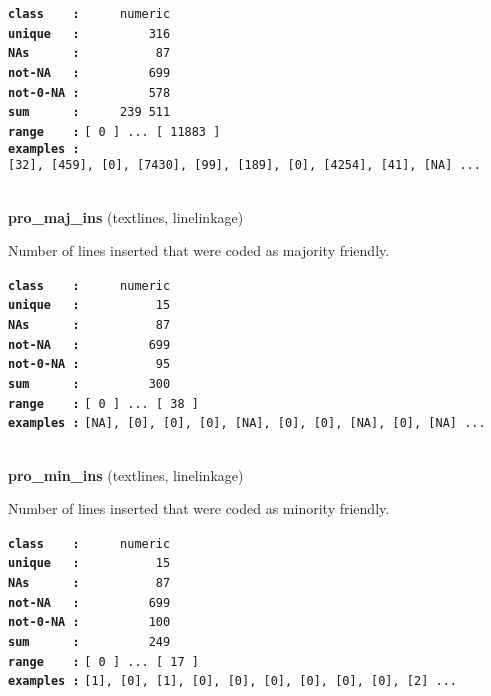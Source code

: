 \documentclass[]{article}
\begin{document}
\textbf{\texttt{class\ \ \ \ :}} \texttt{~~~~~numeric}\\
\textbf{\texttt{unique\ \ \ :}} \texttt{~~~~~~~~~316}\\
\textbf{\texttt{NAs\ \ \ \ \ \ :}} \texttt{~~~~~~~~~~87}\\
\textbf{\texttt{not-NA\ \ \ :}} \texttt{~~~~~~~~~699}\\
\textbf{\texttt{not-0-NA\ :}} \texttt{~~~~~~~~~578}\\
\textbf{\texttt{sum\ \ \ \ \ \ :}} \texttt{~~~~~239~511}\\
\textbf{\texttt{range\ \ \ \ :}}
\texttt{{[}\ 0\ {]}\ ...\ {[}\ 11883\ {]}}\\
\textbf{\texttt{examples\ :}}
\texttt{{[}32{]},\ {[}459{]},\ {[}0{]},\ {[}7430{]},\ {[}99{]},\ {[}189{]},\ {[}0{]},\ {[}4254{]},\ {[}41{]},\ {[}NA{]}\ ...}\\

~

\textbf{pro\_maj\_ins} (textlines, linelinkage)

Number of lines inserted that were coded as majority friendly.

\textbf{\texttt{class\ \ \ \ :}} \texttt{~~~~~numeric}\\
\textbf{\texttt{unique\ \ \ :}} \texttt{~~~~~~~~~~15}\\
\textbf{\texttt{NAs\ \ \ \ \ \ :}} \texttt{~~~~~~~~~~87}\\
\textbf{\texttt{not-NA\ \ \ :}} \texttt{~~~~~~~~~699}\\
\textbf{\texttt{not-0-NA\ :}} \texttt{~~~~~~~~~~95}\\
\textbf{\texttt{sum\ \ \ \ \ \ :}} \texttt{~~~~~~~~~300}\\
\textbf{\texttt{range\ \ \ \ :}}
\texttt{{[}\ 0\ {]}\ ...\ {[}\ 38\ {]}}\\
\textbf{\texttt{examples\ :}}
\texttt{{[}NA{]},\ {[}0{]},\ {[}0{]},\ {[}0{]},\ {[}NA{]},\ {[}0{]},\ {[}0{]},\ {[}NA{]},\ {[}0{]},\ {[}NA{]}\ ...}\\

~

\textbf{pro\_min\_ins} (textlines, linelinkage)

Number of lines inserted that were coded as minority friendly.

\textbf{\texttt{class\ \ \ \ :}} \texttt{~~~~~numeric}\\
\textbf{\texttt{unique\ \ \ :}} \texttt{~~~~~~~~~~15}\\
\textbf{\texttt{NAs\ \ \ \ \ \ :}} \texttt{~~~~~~~~~~87}\\
\textbf{\texttt{not-NA\ \ \ :}} \texttt{~~~~~~~~~699}\\
\textbf{\texttt{not-0-NA\ :}} \texttt{~~~~~~~~~100}\\
\textbf{\texttt{sum\ \ \ \ \ \ :}} \texttt{~~~~~~~~~249}\\
\textbf{\texttt{range\ \ \ \ :}}
\texttt{{[}\ 0\ {]}\ ...\ {[}\ 17\ {]}}\\
\textbf{\texttt{examples\ :}}
\texttt{{[}1{]},\ {[}0{]},\ {[}1{]},\ {[}0{]},\ {[}0{]},\ {[}0{]},\ {[}0{]},\ {[}0{]},\ {[}0{]},\ {[}2{]}\ ...}\\
\end{document}
